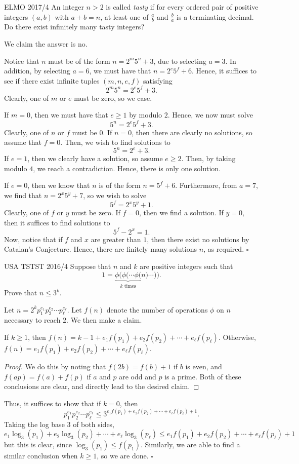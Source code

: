 \documentclass{article}
\begin{document}
\begin{problem}[3.7.17]{ELMO 2017/4}
An integer $n > 2$ is called \emph{tasty} if for every ordered pair of positive integers $(a, b)$ with $a+b = n$, at least one of $\tfrac{a}{b}$ and $\tfrac{b}{a}$ is a terminating decimal. Do there exist infinitely many tasty integers?
\end{problem}

We claim the answer is $\boxed{\text{no}}$.

Notice that $n$ must be of the form $n = 2^m5^n+3$, due to selecting $a = 3$. In addition, by selecting $a = 6$, we must have that $n = 2^e5^f + 6$. Hence, it suffices to see if there exist infinite tuples $(m, n, e, f)$ satisfying \[2^m5^n = 2^e5^f+3.\] Clearly, one of $m$ or $e$ must be zero, so we case.

If $m = 0$, then we must have that $e \ge 1$ by modulo $2$. Hence, we now must solve \[5^n = 2^e5^f + 3.\] Clearly, one of $n$ or $f$ must be $0$. If $n = 0$, then there are clearly no solutions, so assume that $f = 0$. Then, we wish to find solutions to \[5^n = 2^e+3.\] If $e = 1$, then we clearly have a solution, so assume $e \ge 2$. Then, by taking modulo $4$, we reach a contradiction. Hence, there is only one solution.

If $e = 0$, then we know that $n$ is of the form $n = 5^f+6$. Furthermore, from $a = 7$, we find that $n = 2^x5^y+7$, so we wish to solve \[5^f = 2^x5^y+1.\] Clearly, one of $f$ or $y$ must be zero. If $f = 0$, then we find a solution. If $y = 0$, then it suffices to find solutions to \[5^f - 2^x = 1.\] Now, notice that if $f$ and $x$ are greater than $1$, then there exist no solutions by Catalan's Conjecture. Hence, there are finitely many solutions $n$, as required. $\square$

\begin{problem}[3.7.18]{USA TSTST 2016/4}
Suppose that $n$ and $k$ are positive integers such that \[1 = \underbrace{\phi(\phi(\cdots \phi(}_{k\text{ times}}n)\cdots)).\] Prove that $n \le 3^k$.
\end{problem}

Let $n = 2^kp_1^{e_1}p_2^{e_2}\cdots p_{\ell}^{e_{\ell}}$. Let $f(n)$ denote the number of operations $\phi$ on $n$ necessary to reach $2$. We then make a claim.
\begin{claim*}
If $k \ge 1$, then $f(n) = k-1+e_1f(p_1)+e_2f(p_2)+\cdots+e_{\ell}f(p_{\ell})$. Otherwise, $f(n) = e_1f(p_1)+e_2f(p_2)+\cdots+e_{\ell}f(p_{\ell})$.
\end{claim*}
\begin{proof}
We do this by noting that $f(2b) = f(b)+1$ if $b$ is even, and $f(ap) = f(a)+f(p)$ if $a$ and $p$ are odd and $p$ is a prime. Both of these conclusions are clear, and directly lead to the desired claim.
\end{proof}
Thus, it suffices to show that if $k = 0$, then \[p_1^{e_1}p_2^{e_2}\cdots p_{\ell}^{e_{\ell}} \le 3^{e_1f(p_1)+e_2f(p_2)+\cdots+e_{\ell}f(p_{\ell})+1}.\] Taking the log base $3$ of both sides, \[e_1\log_3(p_1)+e_2\log_3(p_2)+\cdots+e_{\ell}\log_3(p_{\ell}) \le e_1f(p_1)+e_2f(p_2)+\cdots+e_{\ell}f(p_{\ell})+1\] but this is clear, since $\log_3(p_1) \le f(p_1)$. Similarly, we are able to find a similar conclusion when $k \ge 1$, so we are done. $\square$
\end{document}
